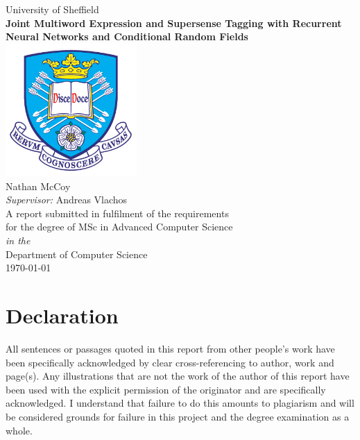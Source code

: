 \documentclass[11pt,oneside]{book}
\begin{document}
\frontmatter

\begin{titlepage}

\begin{center}
{\LARGE University of Sheffield}\\[1.5cm]
\linespread{1.2}\huge {\bfseries Joint Multiword Expression and Supersense Tagging with Recurrent Neural Networks and Conditional Random Fields}\\[1.5cm]
\linespread{1}
\includegraphics[width=5cm]{images/tuoslogo.png}\\[1cm]
{\Large Nathan McCoy}\\[1cm]
{\large \emph{Supervisor:} Andreas Vlachos}\\[1cm]
\large A report submitted in fulfilment of the requirements\\ for the degree of MSc in Advanced Computer Science\\[0.2cm] 
\textit{in the}\\[0.2cm]
Department of Computer Science\\[1cm]
\today
\end{center}

\end{titlepage}


\newpage
\chapter*{\Large Declaration}


All sentences or passages quoted in this report from other people's work have been specifically acknowledged by clear cross-referencing to author, work and page(s). Any illustrations that are not the work of the author of this report have been used with the explicit permission of the originator and are specifically acknowledged. I understand that failure to do this amounts to plagiarism and will be considered grounds for failure in this project and the degree examination as a whole.\\[1cm]
\end{document}
